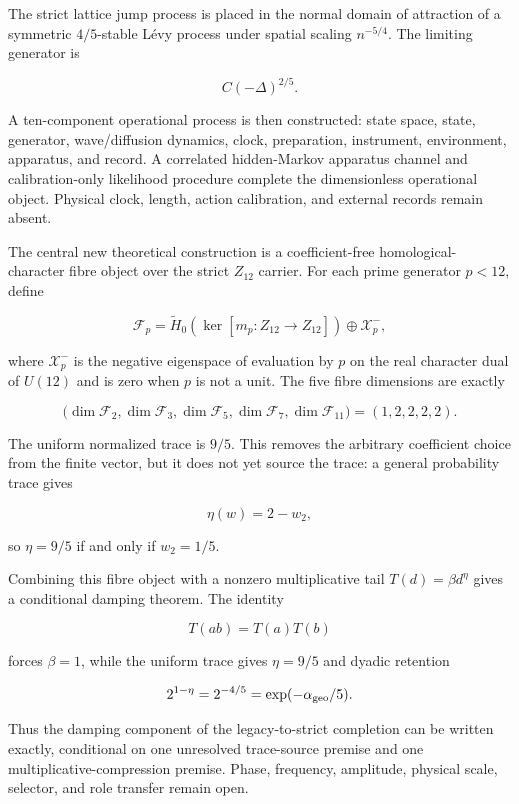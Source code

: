 \documentclass[11pt,a4paper,openany]{report}
\begin{document}
The strict lattice jump process is placed in the normal domain of attraction of a symmetric \(4/5\)-stable Lévy process under spatial scaling \(n^{-5/4}\). The limiting generator is

\[
C(-\Delta)^{2/5}.
\]

A ten-component operational process is then constructed: state space, state, generator, wave/\allowbreak{}diffusion dynamics, clock, preparation, instrument, environment, apparatus, and record. A correlated hidden-Markov apparatus channel and calibration-only likelihood procedure complete the dimensionless operational object. Physical clock, length, action calibration, and external records remain absent.

The central new theoretical construction is a coefficient-free homological-character fibre object over the strict \(Z_{12}\) carrier. For each prime generator \(p<12\), define

\[
\mathcal F_p
=
\widetilde H_0\!\left(
\ker[m_p:Z_{12}\to Z_{12}]
\right)
\oplus
\mathcal X_p^-,
\]

where \(\mathcal X_p^-\) is the negative eigenspace of evaluation by \(p\) on the real character dual of \(U(12)\) and is zero when \(p\) is not a unit. The five fibre dimensions are exactly

\[
\big(
\dim\mathcal F_2,
\dim\mathcal F_3,
\dim\mathcal F_5,
\dim\mathcal F_7,
\dim\mathcal F_{11}
\big)
=(1,2,2,2,2).
\]

The uniform normalized trace is \(9/5\). This removes the arbitrary coefficient choice from the finite vector, but it does not yet source the trace: a general probability trace gives

\[
\eta(w)=2-w_2,
\]

so \(\eta=9/5\) if and only if \(w_2=1/5\).

Combining this fibre object with a nonzero multiplicative tail \(T(d)=\beta d^\eta\) gives a conditional damping theorem. The identity

\[
T(ab)=T(a)T(b)
\]

forces \(\beta=1\), while the uniform trace gives \(\eta=9/5\) and dyadic retention

\[
2^{1-\eta}=2^{-4/5}
=\exp(-\alpha_{\rm geo}/5).
\]

Thus the damping component of the legacy-to-strict completion can be written exactly, conditional on one unresolved trace-source premise and one multiplicative-compression premise. Phase, frequency, amplitude, physical scale, selector, and role transfer remain open.
\end{document}
